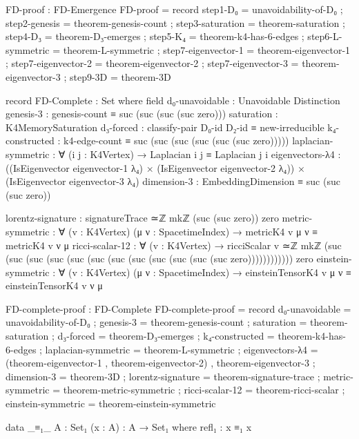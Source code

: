 \documentclass[11pt,a4paper]{book}
\begin{document}
\begin{code}
FD-proof : FD-Emergence
FD-proof = record
  { step1-D₀          = unavoidability-of-D₀
  ; step2-genesis     = theorem-genesis-count
  ; step3-saturation  = theorem-saturation
  ; step4-D₃          = theorem-D₃-emerges
  ; step5-K₄          = theorem-k4-has-6-edges
  ; step6-L-symmetric = theorem-L-symmetric
  ; step7-eigenvector-1 = theorem-eigenvector-1
  ; step7-eigenvector-2 = theorem-eigenvector-2
  ; step7-eigenvector-3 = theorem-eigenvector-3
  ; step9-3D          = theorem-3D
  }

record FD-Complete : Set where
  field
    d₀-unavoidable    : Unavoidable Distinction
    genesis-3         : genesis-count ≡ suc (suc (suc (suc zero)))
    saturation        : K4MemorySaturation
    d₃-forced         : classify-pair D₀-id D₂-id ≡ new-irreducible
    k₄-constructed    : k4-edge-count ≡ suc (suc (suc (suc (suc (suc zero)))))
    laplacian-symmetric : ∀ (i j : K4Vertex) → Laplacian i j ≡ Laplacian j i
    eigenvectors-λ4   : ((IsEigenvector eigenvector-1 λ₄) × (IsEigenvector eigenvector-2 λ₄)) × 
                        (IsEigenvector eigenvector-3 λ₄)
    dimension-3       : EmbeddingDimension ≡ suc (suc (suc zero))
    
    lorentz-signature : signatureTrace ≃ℤ mkℤ (suc (suc zero)) zero
    metric-symmetric  : ∀ (v : K4Vertex) (μ ν : SpacetimeIndex) → metricK4 v μ ν ≡ metricK4 v ν μ
    ricci-scalar-12   : ∀ (v : K4Vertex) → ricciScalar v ≃ℤ mkℤ (suc (suc (suc (suc (suc (suc (suc (suc (suc (suc (suc (suc zero)))))))))))) zero
    einstein-symmetric : ∀ (v : K4Vertex) (μ ν : SpacetimeIndex) → einsteinTensorK4 v μ ν ≡ einsteinTensorK4 v ν μ

FD-complete-proof : FD-Complete
FD-complete-proof = record
  { d₀-unavoidable    = unavoidability-of-D₀
  ; genesis-3         = theorem-genesis-count
  ; saturation        = theorem-saturation
  ; d₃-forced         = theorem-D₃-emerges
  ; k₄-constructed    = theorem-k4-has-6-edges
  ; laplacian-symmetric = theorem-L-symmetric
  ; eigenvectors-λ4   = (theorem-eigenvector-1 , theorem-eigenvector-2) , theorem-eigenvector-3
  ; dimension-3       = theorem-3D
  ; lorentz-signature = theorem-signature-trace
  ; metric-symmetric  = theorem-metric-symmetric
  ; ricci-scalar-12   = theorem-ricci-scalar
  ; einstein-symmetric = theorem-einstein-symmetric
  }

data _≡₁_ {A : Set₁} (x : A) : A → Set₁ where
  refl₁ : x ≡₁ x

\end{code}
\end{document}
